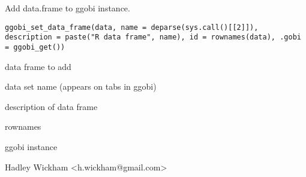 \begin{Description}\relax
Add data.frame to ggobi instance.
\end{Description}
\begin{Usage}
\begin{verbatim}ggobi_set_data_frame(data, name = deparse(sys.call()[[2]]), description = paste("R data frame", name), id = rownames(data), .gobi = ggobi_get())\end{verbatim}
\end{Usage}
\begin{Arguments}
\begin{ldescription}
\item[\code{data}] data frame to add
\item[\code{name}] data set name (appears on tabs in ggobi)
\item[\code{description}] description of data frame
\item[\code{id}] rownames
\item[\code{.gobi}] ggobi instance
\end{ldescription}
\end{Arguments}
\begin{Details}\relax
\end{Details}
\begin{Author}\relax
Hadley Wickham <h.wickham@gmail.com>
\end{Author}
\begin{Examples}
\begin{ExampleCode}\end{ExampleCode}
\end{Examples}

